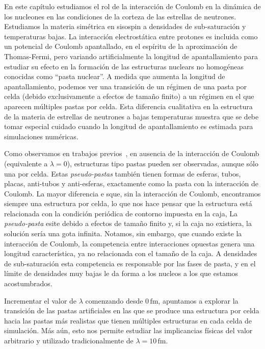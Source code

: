 En este capítulo estudiamos el rol de la interacción de Coulomb en la dinámica de los nucleones en las condiciones de la corteza de las estrellas de neutrones.
Estudiamos la materia simétrica en sisospin a densidades de sub-saturación y temperaturas bajas.
La interacción electrostática entre protones es incluida como un potencial de Coulomb apantallado, en el espíritu de la aproximación de Thomas-Fermi, pero variando artificialmente la longitud de apantallamiento para estudiar su efecto en la formación de las estructuras nuclears no homogéneas conocidas como ``pasta nuclear''.
A medida que aumenta la longitud de apantallamiento, podemos ver una transición de un régimen de una pasta por celda (debido exclusivamente a efectos de tamaño finito) a un régimen en el que aparecen múltiples pastas por celda.
Esta diferencia cualitativa en la estructura de la materia de estrellas de neutrones a bajas temperaturas muestra que se debe tomar especial cuidado cuando la longitud de apantallamiento es estimada para simulaciones numéricas.

Como observamos en trabajos previos~\cite{horo13,nos13}, en ausencia de la interacción de Coulomb (equivalente a $\lambda=0$), estructuras tipo pastas pueden ser observadas, aunque sólo una por celda.
Estas \emph{pseudo-pastas} también tienen formas de esferas, tubos, placas, anti-tubos y anti-esferas, exactamente como la pasta con la interacción de Coulomb.
La mayor diferencia e sque, sin la interacción de Coulomb, encontramos siempre una estructura por celda, lo que nos hace pensar que la estructura está relacionada con la condición periódica de contorno impuesta en la caja,
La \emph{pseudo-pasta} esite debido a efectos de tamaño finito y, si la caja no existiera, la solución sería una gota infinita.
Notamos, sin embargo, que cuando existe la interacción de Coulomb, la competencia entre interacciones opuestas genera una longitud característica, ya no relacionada con el tamaño de la caja.
A densidades de sub-saturación esta competencia es responsable por las fases de pasta, y en el límite de densidades muy bajas le da forma a los nucleos a los que estamos acostumbrados.

Incrementar el valor de $\lambda$ comenzando desde $0\,\text{fm}$, apuntamos a explorar la transición de las pastas artificiales en las que se produce una estructura por celda hacia las pastas más realistas que tienen múltiples estructuras en cada celda de simulación.
Más aún, esto nos permite estudiar las implicancias físicas del valor arbitrario y utilizado tradicionalmente de $\lambda=10\,\text{fm}$.


